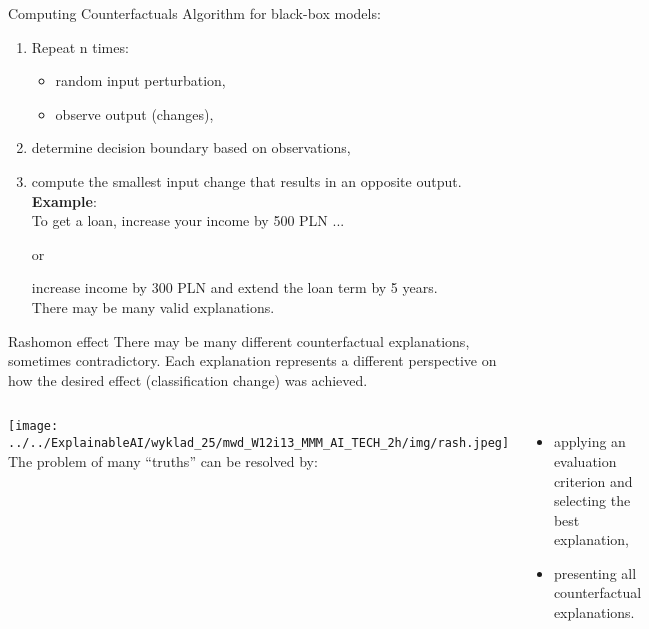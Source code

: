 \documentclass{beamer}
\begin{document}
\begin{frame}{Computing Counterfactuals}
Algorithm for black-box models:\\
\bigskip
\begin{enumerate}
\item Repeat n times:
\begin{itemize}
\item random input perturbation,
\item observe output (changes),
\end{itemize}
\item determine decision boundary based on observations,
\item compute the smallest input change that results in an opposite output.\\
\bigskip 
\textbf{Example}:\\
To get a loan, increase your income by 500 PLN
... 
\begin{center}
or
\end{center}
increase income by 300 PLN and extend the loan term by 5 years.\\
\bigskip
There may be many valid explanations.
\end{enumerate}
\end{frame}

\begin{frame}{Rashomon effect}
There may be many different counterfactual explanations, sometimes contradictory. Each explanation represents a different perspective on how the desired effect (classification change) was achieved.\\

\begin{columns}
\texttt{[image: ../../ExplainableAI/wyklad\_25/mwd\_W12i13\_MMM\_AI\_TECH\_2h/img/rash.jpeg]} 
The problem of many “truths” can be resolved by:
\begin{itemize}
\item applying an evaluation criterion and selecting the best explanation,
\item presenting all counterfactual explanations.
\end{itemize} 
\end{columns}

\end{frame}
\end{document}
